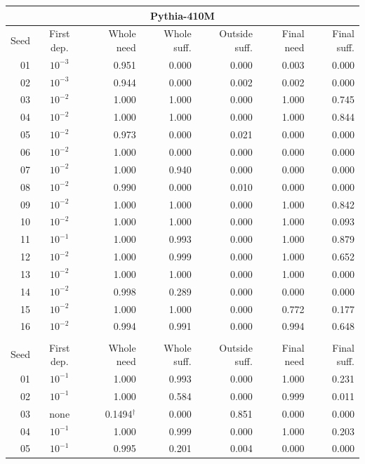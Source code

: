 \begin{tabular}{rcrrrrr}
\multicolumn{7}{c}{\textbf{Pythia-410M}} \\
\toprule
Seed & First dep. & Whole need & Whole suff. & Outside suff. & Final need & Final suff. \\
\midrule
01 & $10^{-3}$ & 0.951 & 0.000 & 0.000 & 0.003 & 0.000 \\
02 & $10^{-3}$ & 0.944 & 0.000 & 0.002 & 0.002 & 0.000 \\
03 & $10^{-2}$ & 1.000 & 1.000 & 0.000 & 1.000 & 0.745 \\
04 & $10^{-2}$ & 1.000 & 1.000 & 0.000 & 1.000 & 0.844 \\
05 & $10^{-2}$ & 0.973 & 0.000 & 0.021 & 0.000 & 0.000 \\
06 & $10^{-2}$ & 1.000 & 0.000 & 0.000 & 0.000 & 0.000 \\
07 & $10^{-2}$ & 1.000 & 0.940 & 0.000 & 0.000 & 0.000 \\
08 & $10^{-2}$ & 0.990 & 0.000 & 0.010 & 0.000 & 0.000 \\
09 & $10^{-2}$ & 1.000 & 1.000 & 0.000 & 1.000 & 0.842 \\
10 & $10^{-2}$ & 1.000 & 1.000 & 0.000 & 1.000 & 0.093 \\
11 & $10^{-1}$ & 1.000 & 0.993 & 0.000 & 1.000 & 0.879 \\
12 & $10^{-2}$ & 1.000 & 0.999 & 0.000 & 1.000 & 0.652 \\
13 & $10^{-2}$ & 1.000 & 1.000 & 0.000 & 1.000 & 0.000 \\
14 & $10^{-2}$ & 0.998 & 0.289 & 0.000 & 0.000 & 0.000 \\
15 & $10^{-2}$ & 1.000 & 1.000 & 0.000 & 0.772 & 0.177 \\
16 & $10^{-2}$ & 0.994 & 0.991 & 0.000 & 0.994 & 0.648 \\
\bottomrule
\addlinespace[4pt]
\multicolumn{7}{c}{\textbf{Pythia-1.4B}} \\
\toprule
Seed & First dep. & Whole need & Whole suff. & Outside suff. & Final need & Final suff. \\
\midrule
01 & $10^{-1}$ & 1.000 & 0.993 & 0.000 & 1.000 & 0.231 \\
02 & $10^{-1}$ & 1.000 & 0.584 & 0.000 & 0.999 & 0.011 \\
03 & none & 0.1494$^{\dagger}$ & 0.000 & 0.851 & 0.000 & 0.000 \\
04 & $10^{-1}$ & 1.000 & 0.999 & 0.000 & 1.000 & 0.203 \\
05 & $10^{-1}$ & 0.995 & 0.201 & 0.004 & 0.000 & 0.000 \\

\end{tabular}
